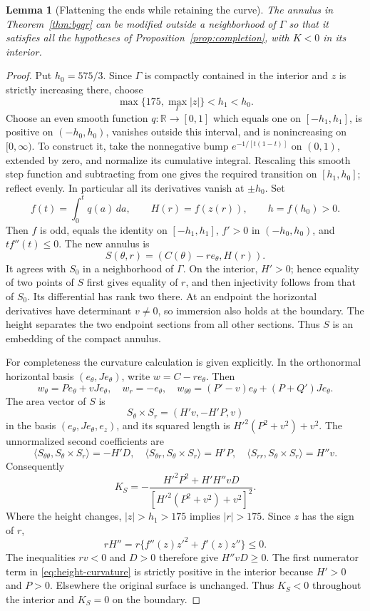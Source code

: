 \documentclass[11pt]{amsart}
\newtheorem{lemma}[theorem]{Lemma}
\theoremstyle{definition}
\newcommand{\R}{\mathbb R}
\begin{document}
\begin{lemma}[Flattening the ends while retaining the curve]
\label{lem:flatten}
The annulus in Theorem~\ref{thm:bgqr} can be modified outside a
neighborhood of $\Gamma$ so that it satisfies all the hypotheses of
Proposition~\ref{prop:completion}, with $K<0$ in its interior.
\end{lemma}
\begin{proof}
Put $h_0=575/3$. Since $\Gamma$ is compactly contained in the
interior and $z$ is strictly increasing there, choose
\[
 \max\{175,\max_\Gamma|z|\}<h_1<h_0.
\]
Choose an even smooth function $q:\R\to[0,1]$ which equals one on
$[-h_1,h_1]$, is positive on $(-h_0,h_0)$, vanishes outside this
interval, and is nonincreasing on $[0,\infty)$.
To construct it, take the nonnegative bump $e^{-1/[t(1-t)]}$ on
$(0,1)$, extended by zero, and normalize its cumulative integral.
Rescaling this smooth step function and subtracting from one gives
the required transition on $[h_1,h_0]$; reflect evenly.
In particular all its derivatives vanish at $\pm h_0$.
Set
\[
 f(t)=\int_0^t q(a)\,da,\qquad H(r)=f(z(r)),\qquad h=f(h_0)>0.
\]
Then $f$ is odd, equals the identity on $[-h_1,h_1]$,
$f'>0$ in $(-h_0,h_0)$, and $tf''(t)\le0$.
The new annulus is
\[
 S(\theta,r)=(C(\theta)-re_\theta,H(r)).
\]
It agrees with $S_0$ in a neighborhood of $\Gamma$.
On the interior, $H'>0$; hence equality of two points of $S$
first gives equality of $r$, and then injectivity follows from
that of $S_0$. Its differential has rank two there. At an endpoint
the horizontal derivatives have determinant $v\ne0$, so immersion
also holds at the boundary. The height separates the two endpoint
sections from all other sections. Thus $S$ is an embedding of
the compact annulus.

For completeness the curvature calculation is given explicitly.
In the orthonormal horizontal basis $(e_\theta,Je_\theta)$,
write $w=C-re_\theta$. Then
\[
 w_\theta=P e_\theta+vJe_\theta,\quad w_r=-e_\theta,\quad
 w_{\theta\theta}=(P'-v)e_\theta+(P+Q')Je_\theta .
\]
The area vector of $S$ is
\[
 S_\theta\times S_r=(H'v,-H'P,v)
\]
in the basis $(e_\theta,Je_\theta,e_z)$, and its squared length is
$H'^2(P^2+v^2)+v^2$.
The unnormalized second coefficients are
\[
 \langle S_{\theta\theta},S_\theta\times S_r\rangle=-H'D,
 \quad
 \langle S_{\theta r},S_\theta\times S_r\rangle=H'P,
 \quad
 \langle S_{rr},S_\theta\times S_r\rangle=H''v .
\]
Consequently
\begin{equation}\label{eq:height-curvature}
 K_S=-\frac{H'^2P^2+H'H''vD}
             {[H'^2(P^2+v^2)+v^2]^2}.
\end{equation}
Where the height changes, $|z|>h_1>175$ implies $|r|>175$.
Since $z$ has the sign of $r$,
\[
 rH''=r\{f''(z)z'^2+f'(z)z''\}\le0.
\]
The inequalities $rv<0$ and $D>0$ therefore give $H''vD\ge0$.
The first numerator term in \eqref{eq:height-curvature} is strictly
positive in the interior because $H'>0$ and $P>0$.
Elsewhere the original surface is unchanged. Thus $K_S<0$
throughout the interior and $K_S=0$ on the boundary.


\end{proof}
\end{document}
